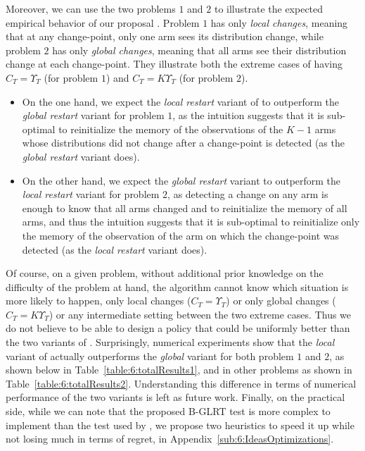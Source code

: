 Moreover, we can use the two problems $1$ and $2$ to illustrate the expected empirical behavior of our proposal \GLRklUCB.
Problem $1$ has only \emph{local changes}, meaning that at any change-point, only one arm sees its distribution change, while problem $2$ has only \emph{global changes}, meaning that all arms see their distribution change at each change-point.
They illustrate both the extreme cases of having $C_T = \Upsilon_T$ (for problem $1$) and $C_T = K \Upsilon_T$ (for problem $2$).
\begin{itemize}
    \item
On the one hand, we expect the \emph{local restart} variant of \GLRklUCB{} to outperform the \emph{global restart} variant for problem $1$, as the intuition suggests that it is sub-optimal to reinitialize the memory of the observations of the $K-1$ arms whose distributions did not change after a change-point is detected (as the \emph{global restart} variant does).
    \item
On the other hand, we expect the \emph{global restart} variant to outperform the \emph{local restart} variant for problem $2$, as detecting a change on any arm is enough to know that all arms changed and to reinitialize the memory of all arms, and thus the intuition suggests that it is sub-optimal to reinitialize only the memory of the observation of the arm on which the change-point was detected (as the \emph{local restart} variant does).
\end{itemize}
%
Of course, on a given problem, without additional prior knowledge on the difficulty of the problem at hand, the algorithm cannot know which situation is more likely to happen, only local changes ($C_T = \Upsilon_T$) or only global changes ($C_T = K \Upsilon_T$) or any intermediate setting between the two extreme cases.
Thus we do not believe to be able to design a policy that could be uniformly better than the two variants of \GLRklUCB.
%
Surprisingly, numerical experiments show that the \emph{local} variant of \GLRklUCB{} actually outperforms the \emph{global} variant for both problem $1$ and $2$, as shown below in Table~\ref{table:6:totalResults1}, and in other problems as shown in Table~\ref{table:6:totalResults2}.
%
Understanding this difference in terms of numerical performance of the two variants is left as future work.
%
Finally, on the practical side, while we can note that the proposed B-GLRT test is more complex to implement than the test used by \MUCB, we propose two heuristics to speed it up while not losing much in terms of regret, in Appendix~\ref{sub:6:IdeasOptimizations}.



